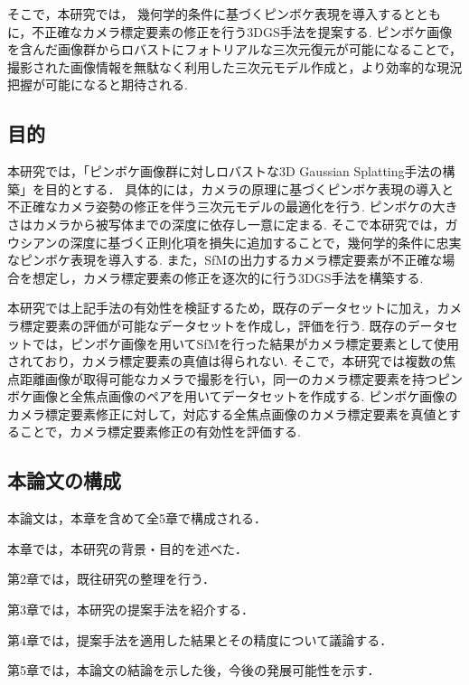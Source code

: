 そこで，本研究では， 幾何学的条件に基づくピンボケ表現を導入するとともに，不正確なカメラ標定要素の修正を行う3DGS手法を提案する.
ピンボケ画像を含んだ画像群からロバストにフォトリアルな三次元復元が可能になることで，撮影された画像情報を無駄なく利用した三次元モデル作成と，より効率的な現況把握が可能になると期待される.\par

\subsection{目的}\label{subsec:objective}

本研究では，「ピンボケ画像群に対しロバストな3D Gaussian Splatting手法の構築」を目的とする．
具体的には，カメラの原理に基づくピンボケ表現の導入と不正確なカメラ姿勢の修正を伴う三次元モデルの最適化を行う.
ピンボケの大きさはカメラから被写体までの深度に依存し一意に定まる.
そこで本研究では，ガウシアンの深度に基づく正則化項を損失に追加することで，幾何学的条件に忠実なピンボケ表現を導入する.
また，SfMの出力するカメラ標定要素が不正確な場合を想定し，カメラ標定要素の修正を逐次的に行う3DGS手法を構築する.\par

本研究では上記手法の有効性を検証するため，既存のデータセットに加え，カメラ標定要素の評価が可能なデータセットを作成し，評価を行う.
既存のデータセットでは，ピンボケ画像を用いてSfMを行った結果がカメラ標定要素として使用されており，カメラ標定要素の真値は得られない.
そこで，本研究では複数の焦点距離画像が取得可能なカメラで撮影を行い，同一のカメラ標定要素を持つピンボケ画像と全焦点画像のペアを用いてデータセットを作成する.
ピンボケ画像のカメラ標定要素修正に対して，対応する全焦点画像のカメラ標定要素を真値とすることで，カメラ標定要素修正の有効性を評価する.

\subsection{本論文の構成}\label{subsec:construction}

本論文は，本章を含めて全5章で構成される．

本章では，本研究の背景・目的を述べた．

第2章では，既往研究の整理を行う．

第3章では，本研究の提案手法を紹介する．

第4章では，提案手法を適用した結果とその精度について議論する．

第5章では，本論文の結論を示した後，今後の発展可能性を示す．